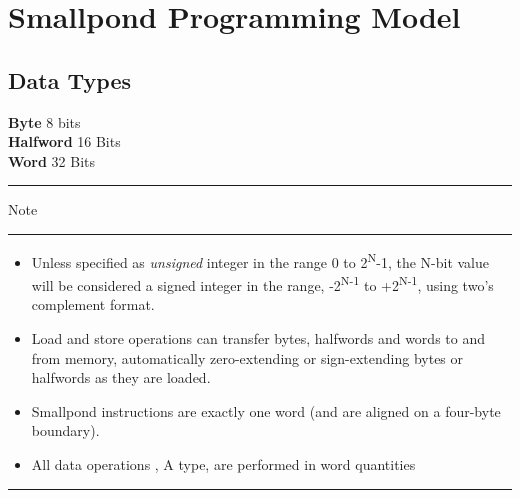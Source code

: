 \documentclass[12pt]{article}
\begin{document}
\newpage

\section{Smallpond Programming Model}
    \subsection{Data Types}
    \textbf{Byte} \hspace{2cm}8 bits\\
    \textbf{Halfword} \hspace{1.05cm}16 Bits\\
    \textbf{Word} \hspace{1.8cm}32 Bits\\
    
   \noindent\rule{1.5cm}{0.3pt}Note\rule{1.5cm}{0.3pt}
   
   \begin{itemize}
       \item Unless specified as \textit{unsigned} integer in the range 0 to 2\textsuperscript{N}-1, the N-bit value will be considered a signed integer in the range, -2\textsuperscript{N-1} to +2\textsuperscript{N-1}, using two's complement format.
       
       \item Load and store operations can transfer bytes, halfwords and words to and from memory,
        automatically zero-extending or sign-extending bytes or halfwords as they are loaded.

       \item Smallpond instructions are exactly one word (and are aligned on a four-byte boundary).
       
       \item All data operations , A type, are performed in word quantities
   \end{itemize}
   
   \noindent\rule{4cm}{0.3pt}
   
\end{document}
